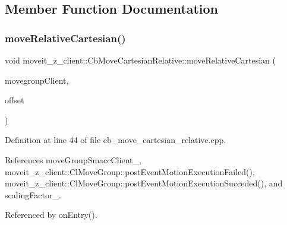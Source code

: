 \subsection{Member Function Documentation}
\mbox{\label{classmoveit__z__client_1_1CbMoveCartesianRelative_aa8535a52826c36b103abebba6da7737f}} 
\subsubsection{\texorpdfstring{move\+Relative\+Cartesian()}{moveRelativeCartesian()}}
{\footnotesize\ttfamily void moveit\+\_\+z\+\_\+client\+::\+Cb\+Move\+Cartesian\+Relative\+::move\+Relative\+Cartesian (\begin{DoxyParamCaption}\item[{moveit\+::planning\+\_\+interface\+::\+Move\+Group\+Interface $\ast$}]{movegroup\+Client,  }\item[{geometry\+\_\+msgs\+::\+Vector3 \&}]{offset }\end{DoxyParamCaption})}



Definition at line 44 of file cb\+\_\+move\+\_\+cartesian\+\_\+relative.\+cpp.



References move\+Group\+Smacc\+Client\+\_\+, moveit\+\_\+z\+\_\+client\+::\+Cl\+Move\+Group\+::post\+Event\+Motion\+Execution\+Failed(), moveit\+\_\+z\+\_\+client\+::\+Cl\+Move\+Group\+::post\+Event\+Motion\+Execution\+Succeded(), and scaling\+Factor\+\_\+.



Referenced by on\+Entry().


